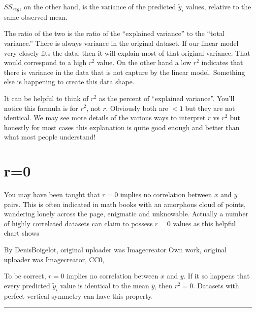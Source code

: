 \documentclass[letterpaper,10pt,english]{jupyterBook}
\begin{document}
\sphinxAtStartPar
\(SS_{reg}\), on the other hand, is the variance of the predicted \(\tilde{y}_i\) values, relative to the same observed mean.

\sphinxAtStartPar
The ratio of the two is the ratio of the “explained variance” to the “total variance.” There is always variance in the original dataset. If our linear
model very closely fits the data, then it will explain most of that original variance. That would correspond to a high \(r^2\) value. On the other hand
a low \(r^2\) indicates that there is variance in the data that is not capture by the linear model. Something else is happening to create this
data shape.

\sphinxAtStartPar
It can be helpful to think of \(r^2\) as the percent of “explained variance”. You’ll notice this formula is for \(r^2\), not \(r\). Obviously both are \(<1\) but
they are not identical. We may see more details of the various ways to interpret \(r\) vs \(r^2\) but honestly for most cases this explanation
is quite good enough and better than what most people understand!


\section{r=0}
\label{\detokenize{lessons/Correlation_Coefficient:r-0}}
\sphinxAtStartPar
You may have been taught that \(r=0\) implies no correlation between \(x\) and \(y\) pairs. This is often indicated in math books with an
amorphous cloud of points, wandering lonely across the page, enigmatic and unknowable. Actually a number of highly correlated
datasets can claim to possess \(r=0\) values as this helpful chart shows%
\begin{footnote}[1]\sphinxAtStartFootnote
By DenisBoigelot, original uploader was Imagecreator \sphinxhyphen{} Own work, original uploader was Imagecreator, CC0, 
%
\end{footnote}

\sphinxAtStartPar
{}

\sphinxAtStartPar
To be correct, \(r=0\) implies no  correlation between \(x\) and \(y\). If it so happens that every predicted \(\tilde{y}_i\) value is identical to the
mean \(\overline{y}\), then \(r^2=0\). Datasets with perfect vertical symmetry can have this property.


\bigskip\hrule\bigskip
\end{document}
